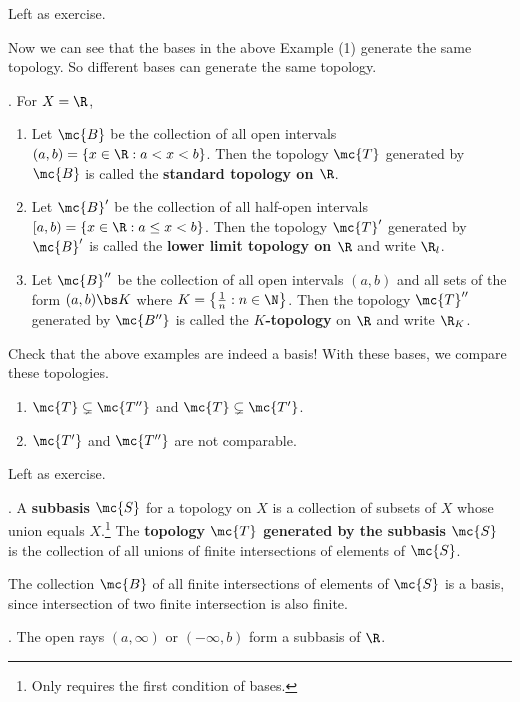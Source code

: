 \pf Left as exercise.

Now we can see that the bases in the above {\sffamily Example} (1) generate the same topology. So different bases can generate the same topology.

\ex. For \(X = \R\),
\begin{enumerate}
    \item Let \(\mc{B}\) be the collection of all open intervals \((a, b) = \{x \in \R : a < x < b\}\). Then the topology \(\mc{T}\) generated by \(\mc{B}\) is called the \textbf{standard topology on \(\R\)}.
    \item Let \(\mc{B}'\) be the collection of all half-open intervals \([a, b) = \{x \in \R : a \leq x < b\}\). Then the topology \(\mc{T}'\) generated by \(\mc{B}'\) is called the \textbf{lower limit topology on \(\R\)} and write \(\R_l\).
    \item Let \(\mc{B}''\) be the collection of all open intervals \((a, b)\) and all sets of the form \((a, b) \bs K\) where \(K = \left\{\frac{1}{n} : n \in \N\right\}\). Then the topology \(\mc{T}''\) generated by \(\mc{B''}\) is called the \textbf{\(K\)-topology} on \(\R\) and write \(\R_K\).
\end{enumerate}

Check that the above examples are indeed a basis! With these bases, we compare these topologies.

\begin{enumerate}
    \item \(\mc{T} \subsetneq \mc{T''}\) and \(\mc{T} \subsetneq \mc{T'}\).
    \item \(\mc{T'}\) and \(\mc{T''}\) are not comparable.
\end{enumerate}

\pf Left as exercise.

.  A \textbf{subbasis} \(\mc{S}\) for a topology on \(X\) is a collection of subsets of \(X\) whose union equals \(X\).\footnote{Only requires the first condition of bases.} The \textbf{topology \(\mc{T}\) generated by the subbasis \(\mc{S}\)} is the collection of all unions of finite intersections of elements of \(\mc{S}\).

The collection \(\mc{B}\) of all finite intersections of elements of \(\mc{S}\) is a basis, since intersection of two finite intersection is also finite.

\ex. The open rays \((a, \infty)\) or \((-\infty, b)\) form a subbasis of \(\R\).


